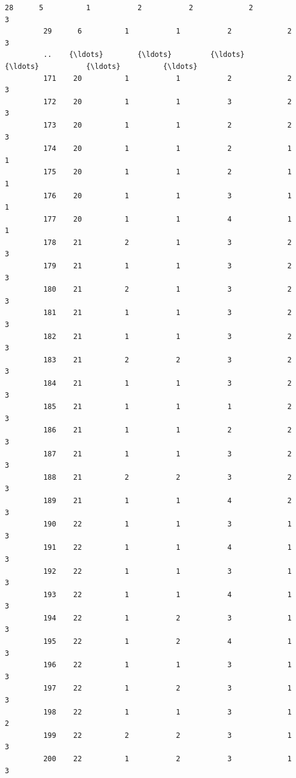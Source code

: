 \documentclass[11pt]{article}
\begin{document}
\begin{Verbatim}[commandchars=\\\{\}]
         28      5          1           2           2             2            3   
         29      6          1           1           2             2            3   
         ..    {\ldots}        {\ldots}         {\ldots}         {\ldots}           {\ldots}          {\ldots}   
         171    20          1           1           2             2            3   
         172    20          1           1           3             2            3   
         173    20          1           1           2             2            3   
         174    20          1           1           2             1            1   
         175    20          1           1           2             1            1   
         176    20          1           1           3             1            1   
         177    20          1           1           4             1            1   
         178    21          2           1           3             2            3   
         179    21          1           1           3             2            3   
         180    21          2           1           3             2            3   
         181    21          1           1           3             2            3   
         182    21          1           1           3             2            3   
         183    21          2           2           3             2            3   
         184    21          1           1           3             2            3   
         185    21          1           1           1             2            3   
         186    21          1           1           2             2            3   
         187    21          1           1           3             2            3   
         188    21          2           2           3             2            3   
         189    21          1           1           4             2            3   
         190    22          1           1           3             1            3   
         191    22          1           1           4             1            3   
         192    22          1           1           3             1            3   
         193    22          1           1           4             1            3   
         194    22          1           2           3             1            3   
         195    22          1           2           4             1            3   
         196    22          1           1           3             1            3   
         197    22          1           2           3             1            3   
         198    22          1           1           3             1            2   
         199    22          2           2           3             1            3   
         200    22          1           2           3             1            3   
         

\end{Verbatim}
\end{document}
